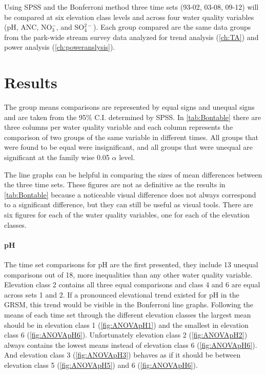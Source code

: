 Using SPSS and the Bonferroni method three time sets (93-02, 03-08, 09-12) will be compared at six elevation class levels and across four water quality variables (pH, ANC, NO$_3^-$, and SO$_4^{2-}$).
Each group compared are the same data groups from the park-wide stream survey data analyzed for trend analysis (\autoref{ch:TA}) and power analysis (\autoref{ch:poweranslysis}).

\section{Results}%


The group means comparisons are represented by equal signs and unequal signs and are taken from the 95$\%$ C.I. determined by SPSS.
In \autoref{tab:Bontable} there are three columns per water quality variable and each column represents the comparison of two groups of the same variable in different times.
All groups that were found to be equal were insignificant, and all groups that were unequal are significant at the family wise 0.05 $\alpha$ level.

The line graphs can be helpful in comparing the sizes of mean differences between the three time sets.
These figures are not as definitive as the results in \autoref{tab:Bontable} because a noticeable visual difference does not always correspond to a significant difference, but they can still be useful as visual tools.
There are six figures for each of the water quality variables, one for each of the elevation classes.







\pagebreak


\paragraph{pH}

The time set comparisons for pH are the first presented, they include 13 unequal comparisons out of 18,  more inequalities than any other water quality variable.
Elevation class 2 contains all three equal comparisons and class 4 and 6 are equal across sets 1 and 2.
If a pronounced elevational trend existed for pH in the GRSM, this trend would be visible in the Bonferroni line graphs.
Following the means of each time set through the different elevation classes the largest mean should be in elevation class 1 (\autoref{fig:ANOVApH1}) and the smallest in elevation class 6 (\autoref{fig:ANOVApH6}).
Unfortunately elevation class 2 (\autoref{fig:ANOVApH2}) always contains the lowest means instead of elevation class 6 (\autoref{fig:ANOVApH6}).
And elevation class 3 (\autoref{fig:ANOVApH3}) behaves as if it should be between elevation class 5 (\autoref{fig:ANOVApH5}) and 6 (\autoref{fig:ANOVApH6}).

